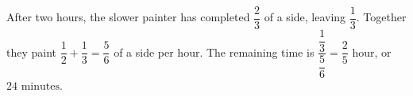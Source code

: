 After two hours, the slower painter has completed $\dfrac{2}{3}$ of a side, leaving $\dfrac{1}{3}$. Together they paint $\dfrac{1}{2}+\dfrac{1}{3}=\dfrac{5}{6}$ of a side per hour. The remaining time is $\dfrac{\dfrac{1}{3}}{\dfrac{5}{6}}=\dfrac{2}{5}$ hour, or $\boxed{24\text{ minutes}}$.
